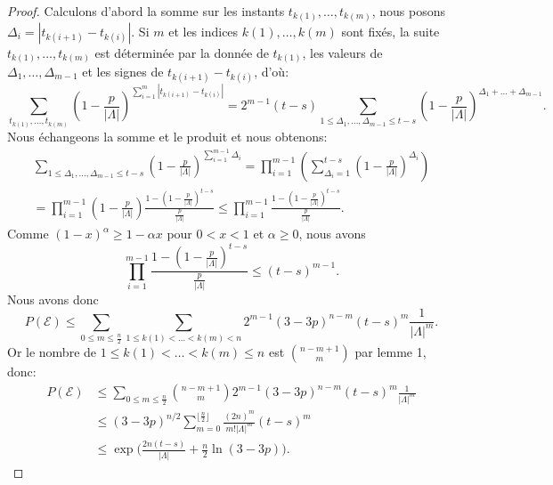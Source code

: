 \documentclass[titlepage,a4paper,12pt]{article}
\newcounter{d}
\newcounter{t}
\newcounter{p}
\newcounter{c}
\newcounter{a}
\newcounter{l}
\begin{document}
\begin{proof}
Calculons d'abord la somme sur les instants $t_{k(1)},\dots,t_{k(m)}$, nous posons $\Delta_i = |t_{k(i+1)}-t_{k(i)}|$. Si $m$ et les indices $k(1),\dots,k(m)$ sont fixés, la suite $t_{k(1)},\dots,t_{k(m)}$ est déterminée par la donnée de $t_{k(1)}$, les valeurs de $\Delta_1,\dots,\Delta_{m-1}$ et les signes de $t_{k(i+1)}-t_{k(i)}$, d'où:
$$\sum_{t_{k(1)},\dots,t_{k(m)}}(1-\frac{p}{|\Lambda|})^{\sum_{i=1}^{m}|t_{k(i+1)}-t_{k(i)}|} = 2^{m-1}(t-s)\sum_{1\leqslant\Delta_1,\dots,\Delta_{m-1}\leqslant t-s}(1-\frac{p}{|\Lambda|})^{\Delta_1+\dots+\Delta_{m-1}}.
$$
Nous échangeons la somme et le produit et nous obtenons:
\begin{multline*}\sum_{1\leqslant\Delta_1,\dots,\Delta_{m-1}\leqslant t-s}(1-\frac{p}{|\Lambda|})^{\sum_{i=1}^{m-1}\Delta_i} = \prod_{i=1}^{m-1}\left(\sum_{\Delta_i = 1}^{t-s}\left(1-\frac{p}{|\Lambda|}\right)^{\Delta_i}\right)\\= \prod_{i=1}^{m-1}\left(1-\frac{p}{|\Lambda|}\right)\frac{\displaystyle1-(1-\frac{p}{|\Lambda|})^{t-s}}{\displaystyle\frac{p}{|\Lambda|}}\leqslant \prod_{i=1}^{m-1}\frac{\displaystyle1-(1-\frac{p}{|\Lambda|})^{t-s}}{\displaystyle\frac{p}{|\Lambda|}}.
\end{multline*}
Comme $(1-x)^\alpha \geqslant 1-\alpha x$ pour $0<x<1$ et $\alpha\geqslant 0$, nous avons 
$$ \prod_{i=1}^{m-1}\frac{\displaystyle 1-(1-\frac{p}{|\Lambda|})^{t-s}}{\displaystyle\frac{p}{|\Lambda|}} \leqslant(t-s)^{m-1}.
$$
Nous avons donc
$$P\left(\mathcal{E}\right) \leqslant\sum_{0\leqslant m \leqslant \frac{n}{2}}\sum_{1\leqslant k(1)<\dots<k(m)<n} 2^{m-1}(3-3p)^{n-m}(t-s)^m\frac{1}{|\Lambda|^m}.
$$
Or le nombre de $1\leqslant k(1)< \dots < k(m) \leqslant n$ est $\binom{n-m+1}{m}$ par lemme 1, donc:
\begin{align*}P\left(\mathcal{E}\right)& \leqslant\sum_{0\leqslant m \leqslant\frac{n}{2}}\binom{n-m+1}{m} 2^{m-1}(3-3p)^{n-m}(t-s)^m\frac{1}{|\Lambda|^m}\\
& \leqslant (3-3p)^{n/2}\sum_{m=0}^{\lfloor\frac{n}{2}\rfloor}\frac{(2n)^m}{m!|\Lambda|^m}(t-s)^m \\
&\leqslant \exp\big(\frac{2n(t-s)}{|\Lambda|}+\frac{n}{2}\ln(3-3p)\big).
\end{align*}
\end{proof}
\end{document}

